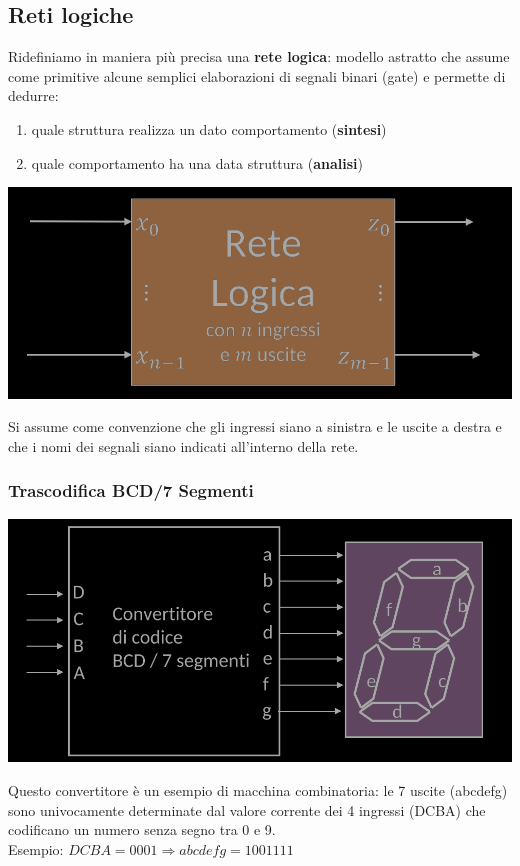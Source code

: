 \documentclass{article}
\begin{document}
\subsection{Reti logiche}
Ridefiniamo in maniera più precisa una \textbf{rete logica}: modello astratto che assume come primitive alcune semplici elaborazioni di segnali binari (gate) e permette di dedurre:
\begin{enumerate}
    \item quale struttura realizza un dato comportamento (\textbf{sintesi})
    \item quale comportamento ha una data struttura (\textbf{analisi})
\end{enumerate}
\begin{center}
    \includegraphics[scale=0.35]{retelog.png}
\end{center}
Si assume come convenzione che gli ingressi siano a sinistra e le uscite a destra e che i nomi dei segnali siano indicati all'interno della rete.
\subsubsection*{Trascodifica BCD/7 Segmenti}
\begin{center}
    \includegraphics[scale=0.35]{bcd-7.png}
\end{center}
Questo convertitore è un esempio di macchina combinatoria: le 7 uscite (abcdefg) sono univocamente determinate dal valore corrente dei 4 ingressi (DCBA) che codificano un numero senza segno tra 0 e 9.\\
Esempio: $DCBA = 0001 \Rightarrow abcdefg = 1001111$
\end{document}
